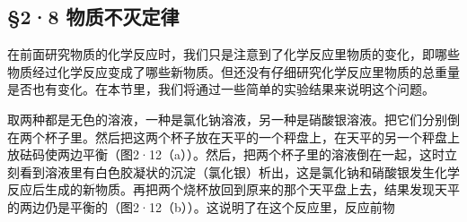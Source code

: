 \subsection{§2·8 物质不灭定律}

在前面研究物质的化学反应时，我们只是注意到了化学反应里物质的变化，即哪些物质经过化学反应变成了哪些新物质。但还没有仔细研究化学反应里物质的总重量是否也有变化。在本节里，我们将通过一些简单的实验结果来说明这个问题。

取两种都是无色的溶液，一种是氯化钠溶液，另一种是硝酸银溶液。把它们分别倒在两个杯子里。然后把这两个杯子放在天平的一个秤盘上，在天平的另一个秤盘上放砝码使两边平衡（图2·12（a））。然后，把两个杯子里的溶液倒在一起，这时立刻看到溶液里有白色胶凝状的沉淀（氯化银）析出，这是氯化钠和硝酸银发生化学反应后生成的新物质。再把两个烧杯放回到原来的那个天平盘上去，结果发现天平的两边仍是平衡的（图2·12（b））。这说明了在这个反应里，反应前物

